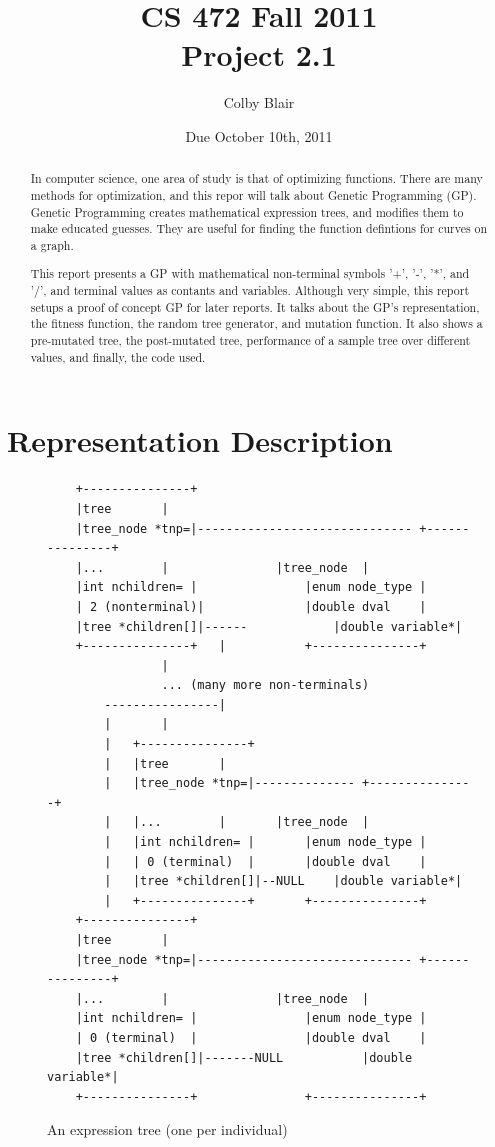 \documentclass[12pt]{article}
\title{CS 472 Fall 2011 \\
     Project 2.1}
\author{Colby Blair}
\date{Due October 10th, 2011}
\begin{document}
\maketitle

\begin{abstract}
In computer science, one area of study is that of optimizing functions. There are many methods for optimization, and this repor will talk about Genetic Programming (GP). Genetic Programming creates mathematical expression trees, and modifies them to make educated guesses. They are useful for finding the function defintions for curves on a graph. 

This report presents a GP with mathematical non-terminal symbols '+', '-', '*', and '/', and terminal values as contants and variables. Although very simple, this report setups a proof of concept GP for later reports. It talks about the GP's representation, the fitness function, the random tree generator, and mutation function. It also shows a pre-mutated tree, the post-mutated tree, performance of a sample tree over different values, and finally, the code used.
\end{abstract}

\pagebreak

\tableofcontents
\listoffigures

\pagebreak

\part{Representation Description}

\begin{figure}[!h]
        \begin{center}
		\scriptsize
		\begin{lstlisting}
	+---------------+
	|tree		|
	|tree_node *tnp=|------------------------------ +---------------+
	|...		|				|tree_node	|
	|int nchildren= |				|enum node_type	|
	| 2 (nonterminal)|				|double dval	|
	|tree *children[]|------			|double variable*|
	+---------------+	|			+---------------+
				|
				... (many more non-terminals)
		----------------|
		|		|
		|	+---------------+
		|	|tree		|
		|	|tree_node *tnp=|-------------- +---------------+
		|	|...		|		|tree_node	|
		|	|int nchildren= |		|enum node_type	|
		|	| 0 (terminal)	|		|double dval	|
		|	|tree *children[]|--NULL	|double variable*|
		|	+---------------+		+---------------+
	+---------------+
	|tree		|
	|tree_node *tnp=|------------------------------ +---------------+
	|...		|				|tree_node	|
	|int nchildren= |				|enum node_type	|
	| 0 (terminal)	|				|double dval	|
	|tree *children[]|-------NULL			|double variable*|
	+---------------+				+---------------+
		\end{lstlisting}
		\normalsize
               \caption{An expression tree (one per individual)}
                \label{tree_rep}
        \end{center}
\end{figure}
\end{document}
